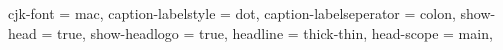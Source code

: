 {{    cjk-font = mac,
    caption-labelstyle = dot,
    caption-labelseperator = colon,
    show-head = true,
    show-headlogo = true,
    headline = thick-thin,
    head-scope = main,
}}
